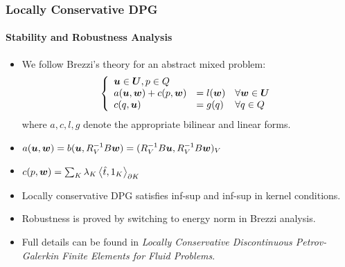 \documentclass[18pt,xcolor=table]{beamer}
\begin{document}
\begin{frame}
\frametitle{Locally Conservative DPG}
\framesubtitle{Stability and Robustness Analysis}
\begin{itemize}
\item We follow Brezzi's theory for an abstract mixed problem:
\begin{equation*}
\left\{
\begin{array}{lll}
\boldsymbol u \in \boldsymbol U, p \in Q\\
a(\boldsymbol u,\boldsymbol w) + c(p,\boldsymbol w) & = l(\boldsymbol w) & \forall \boldsymbol w \in \boldsymbol U \\
c(q,\boldsymbol u) & = g(q) & \forall q \in Q
\end{array}
\right.
\end{equation*}
where $a,c,l,g$ denote the appropriate
bilinear and linear forms. 
\item $a(\boldsymbol u,\boldsymbol w)=b(\boldsymbol u,R_V^{-1}B\boldsymbol w)=(R_V^{-1}B\boldsymbol u,R_V^{-1}B\boldsymbol w)_V$
\item $c(p,\boldsymbol w)=\sum_K\lambda_K\left\langle \hat t,1_K \right\rangle_{\partial K}$

\item Locally conservative DPG satisfies inf-sup and inf-sup in kernel conditions.

\item Robustness is proved by switching to energy norm in Brezzi analysis.

\item Full details can be found in \emph{Locally Conservative Discontinuous Petrov-Galerkin Finite Elements for Fluid Problems}.
\end{itemize}
\end{frame}
\end{document}
